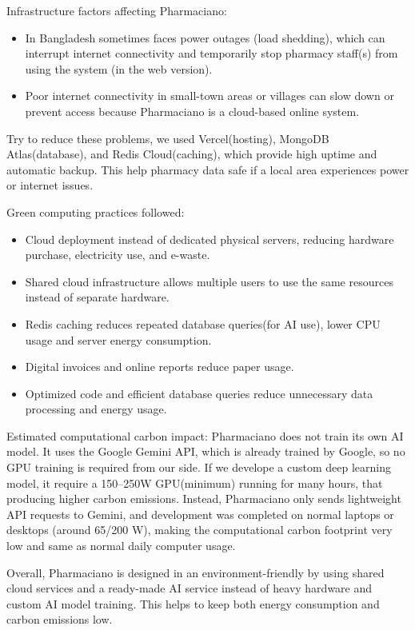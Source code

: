 Infrastructure factors affecting Pharmaciano:
\begin{itemize}
\item In Bangladesh sometimes faces power outages (load shedding), which can interrupt internet connectivity and temporarily stop pharmacy staff(s) from using the system (in the web version).
\item Poor internet connectivity in small-town areas or villages can slow down or prevent access because Pharmaciano is a cloud-based online system.
\end{itemize}
Try to reduce these problems, we used Vercel(hosting), MongoDB Atlas(database), and Redis Cloud(caching), which provide high uptime and automatic backup. This help pharmacy data safe if a local area experiences power or internet issues.

Green computing practices followed:
\begin{itemize}
\item Cloud deployment instead of dedicated physical servers, reducing hardware purchase, electricity use, and e-waste.
\item Shared cloud infrastructure allows multiple users to use the same resources instead of separate hardware.
\item Redis caching reduces repeated database queries(for AI use), lower CPU usage and server energy consumption.
\item Digital invoices and online reports reduce paper usage.
\item Optimized code and efficient database queries reduce unnecessary data processing and energy usage.
\end{itemize}

Estimated computational carbon impact:
Pharmaciano does not train its own AI model. It uses the Google Gemini API, which is already trained by Google, so no GPU training is required from our side. If we develope a custom deep learning model, it require a 150–250W GPU(minimum) running for many hours, that producing higher carbon emissions. Instead, Pharmaciano only sends lightweight API requests to Gemini, and development was completed on normal laptops or desktops (around 65/200 W), making the computational carbon footprint very low and same as normal daily computer usage.

Overall, Pharmaciano is designed in an environment-friendly by using shared cloud services and a ready-made AI service instead of heavy hardware and custom AI model training. This helps to keep both energy consumption and carbon emissions low.

